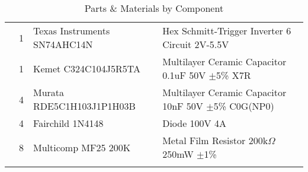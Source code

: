 \begin{longtabu}{X[3,c,m] X[1,c,m] X[3,c,m] X[5,l,m]}
   & 1 & Texas Instruments SN74AHC14N & Hex Schmitt-Trigger Inverter 6 Circuit 2V-5.5V \\
  & 1 & Kemet C324C104J5R5TA & Multilayer Ceramic Capacitor 0.1uF 50V $\pm$5\% X7R \\
  & 4 & Murata RDE5C1H103J1P1H03B & Multilayer Ceramic Capacitor 10nF 50V $\pm$5\% C0G(NP0) \\
  & 4 & Fairchild 1N4148 & Diode 100V 4A \\
  & 8 & Multicomp MF25 200K & Metal Film Resistor 200k$\Omega$ 250mW $\pm$1\% \\

  \bhrule
\caption{Parts \& Materials by Component}
\end{longtabu}

